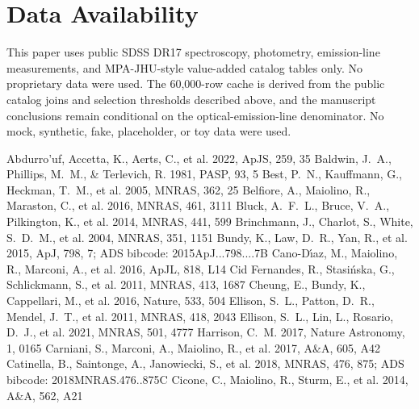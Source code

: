 \documentclass[twocolumn]{aastex631}
\begin{document}
\section*{Data Availability}
This paper uses public SDSS DR17 spectroscopy, photometry, emission-line measurements, and MPA-JHU-style value-added catalog tables only. No proprietary data were used. The 60,000-row cache is derived from the public catalog joins and selection thresholds described above, and the manuscript conclusions remain conditional on the optical-emission-line denominator. No mock, synthetic, fake, placeholder, or toy data were used.


\begin{thebibliography}{}
 Abdurro'uf, Accetta, K., Aerts, C., et al. 2022, ApJS, 259, 35
 Baldwin, J.~A., Phillips, M.~M., \& Terlevich, R. 1981, PASP, 93, 5
 Best, P.~N., Kauffmann, G., Heckman, T.~M., et al. 2005, MNRAS, 362, 25
 Belfiore, A., Maiolino, R., Maraston, C., et al. 2016, MNRAS, 461, 3111
 Bluck, A.~F.~L., Bruce, V.~A., Pilkington, K., et al. 2014, MNRAS, 441, 599
 Brinchmann, J., Charlot, S., White, S.~D.~M., et al. 2004, MNRAS, 351, 1151
 Bundy, K., Law, D.~R., Yan, R., et al. 2015, ApJ, 798, 7; ADS bibcode: 2015ApJ...798....7B
 Cano-D\'{\i}az, M., Maiolino, R., Marconi, A., et al. 2016, ApJL, 818, L14
 Cid Fernandes, R., Stasi{\'n}ska, G., Schlickmann, S., et al. 2011, MNRAS, 413, 1687
 Cheung, E., Bundy, K., Cappellari, M., et al. 2016, Nature, 533, 504
 Ellison, S.~L., Patton, D.~R., Mendel, J.~T., et al. 2011, MNRAS, 418, 2043
 Ellison, S.~L., Lin, L., Rosario, D.~J., et al. 2021, MNRAS, 501, 4777
 Harrison, C.~M. 2017, Nature Astronomy, 1, 0165
 Carniani, S., Marconi, A., Maiolino, R., et al. 2017, A\&A, 605, A42
 Catinella, B., Saintonge, A., Janowiecki, S., et al. 2018, MNRAS, 476, 875; ADS bibcode: 2018MNRAS.476..875C
 Cicone, C., Maiolino, R., Sturm, E., et al. 2014, A\&A, 562, A21

\end{thebibliography}
\end{document}
